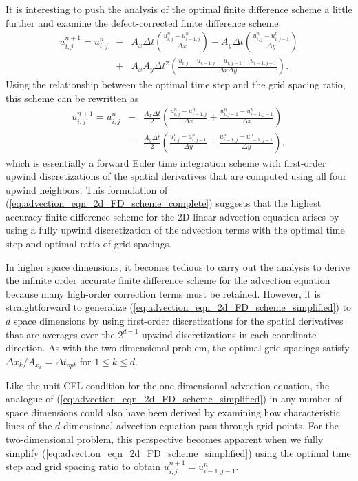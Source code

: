 \documentclass[fleqn,12pt,twoside]{article}
\newcommand{\bea}{\begin{eqnarray}}
\newcommand{\eea}{\end{eqnarray}}
\def\dt{\Delta t}
\def\dx{\Delta x}
\def\dy{\Delta y}
\begin{document}
It is interesting to push the analysis of the optimal finite difference 
scheme a little further and examine the defect-corrected finite difference
scheme:
\bea
  u^{n+1}_{i,j} = u^{n}_{i,j}
  &-& A_x \dt \left( \frac{u^{n}_{i,j} - u^{n}_{i-1,j}}{\dx} \right)
  - A_y \dt \left( \frac{u^{n}_{i,j} - u^{n}_{i,j-1}}{\dy} \right)
  \nonumber \\
  &+& A_x A_y \dt^2 
        \left( \frac{u_{i,j} - u_{i-1,j} - u_{i,j-1} + u_{i-1,j-1}}
                    {\dx \dy} 
        \right).
  \label{eq:advection_eqn_2d_FD_scheme_complete}
\eea
Using the relationship between the optimal time step and the grid spacing
ratio, this scheme can be rewritten as
\bea
  u^{n+1}_{i,j} = u^{n}_{i,j}
  &-& \frac{A_x \dt}{2}
    \left( \frac{u^{n}_{i,j} - u^{n}_{i-1,j}}{\dx} 
         + \frac{u^{n}_{i,j-1} - u^{n}_{i-1,j-1}}{\dx} 
    \right)
  \nonumber \\
  &-& \frac{A_y \dt}{2}
    \left( \frac{u^{n}_{i,j} - u^{n}_{i,j-1}}{\dy} 
         + \frac{u^{n}_{i-1,j} - u^{n}_{i-1,j-1}}{\dy} 
    \right),
  \label{eq:advection_eqn_2d_FD_scheme_simplified}
\eea
which is essentially a forward Euler time integration scheme with 
first-order upwind discretizations of the spatial derivatives that are 
computed using all four upwind neighbors.  This formulation of 
(\ref{eq:advection_eqn_2d_FD_scheme_complete}) suggests that the highest
accuracy finite difference scheme for the 2D linear advection equation arises
by using a fully upwind discretization of the advection terms with the 
optimal time step and optimal ratio of grid spacings.

In higher space dimensions, it becomes tedious to carry out the analysis 
to derive the infinite order accurate finite difference scheme for the 
advection equation because many high-order correction terms must be retained.  
However, it is straightforward to generalize 
(\ref{eq:advection_eqn_2d_FD_scheme_simplified}) to $d$ space dimensions by 
using first-order discretizations for the spatial derivatives that are 
averages over the $2^{d-1}$ upwind discretizations in each coordinate 
direction.   As with the two-dimensional problem, the optimal grid spacings 
satisfy $\dx_k/A_{x_k} = \dt_{opt}$ for $1 \le k \le d$.

Like the unit CFL condition for the one-dimensional advection equation, the 
analogue of (\ref{eq:advection_eqn_2d_FD_scheme_simplified}) in any number
of space dimensions could also have been derived by examining how 
characteristic lines of the $d$-dimensional advection equation pass 
through grid points.  For the two-dimensional problem, this perspective 
becomes apparent when we fully simplify 
(\ref{eq:advection_eqn_2d_FD_scheme_simplified}) using the 
optimal time step and grid spacing ratio to obtain
$u^{n+1}_{i,j} = u^{n}_{i-1,j-1}$.
\end{document}
